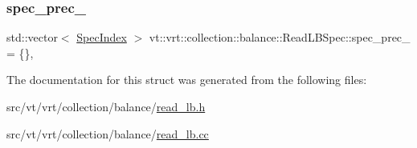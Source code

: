 \mbox{\label{structvt_1_1vrt_1_1collection_1_1balance_1_1_read_l_b_spec_a53d7c8950db9d6b4d8b7d895d0a264d0}} 
\subsubsection{\texorpdfstring{spec\+\_\+prec\+\_\+}{spec\_prec\_}}
{\footnotesize\ttfamily std\+::vector$<$ \hyperlink{namespacevt_1_1vrt_1_1collection_1_1balance_a72a5e0d9936ddf57f8e6c64e0e9fd123}{Spec\+Index} $>$ vt\+::vrt\+::collection\+::balance\+::\+Read\+L\+B\+Spec\+::spec\+\_\+prec\+\_\+ = \{\}\hspace{0.3cm}{\ttfamily [static]}, {\ttfamily [private]}}



The documentation for this struct was generated from the following files\+:\begin{DoxyCompactItemize}
\item 
src/vt/vrt/collection/balance/\hyperlink{read__lb_8h}{read\+\_\+lb.\+h}\item 
src/vt/vrt/collection/balance/\hyperlink{read__lb_8cc}{read\+\_\+lb.\+cc}\end{DoxyCompactItemize}
